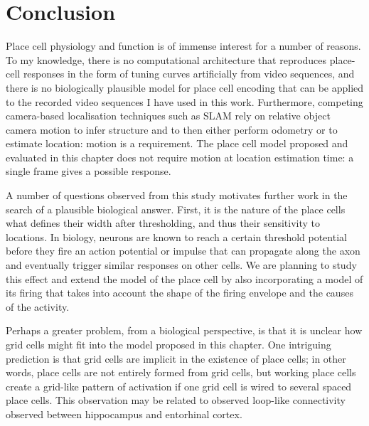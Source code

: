 %



\section{Conclusion}

Place cell physiology and function is of immense interest for a number of reasons. To my knowledge, there is no computational architecture that reproduces place-cell responses in the form of tuning curves artificially from video sequences, and there is no biologically plausible model for place cell encoding that can be applied to the recorded video sequences I have used in this work.  Furthermore, competing camera-based localisation techniques such as SLAM rely on relative object camera motion to infer structure and to then either perform odometry or to estimate location: motion is a requirement.  The place cell model proposed and evaluated in this chapter does not require motion at location estimation time: a single frame gives a possible response.

A number of questions observed from this study motivates further work in the search of a plausible biological answer. First, it is the nature of the place cells what defines their width after thresholding, and thus their sensitivity to locations. In biology, neurons are known to reach a certain threshold potential before they fire an action potential or impulse that can propagate along the axon and eventually trigger similar responses on other cells. We are planning to study this effect and extend the model of the place cell by also incorporating a model of its firing that takes into account the shape of the firing envelope and the causes of the activity.

Perhaps a greater problem, from a biological perspective, is that it is unclear how grid cells might fit into the model proposed in this chapter.  One intriguing prediction is that grid cells are implicit in the existence of place cells; in other words, place cells are not entirely formed from grid cells, but working place cells create a grid-like pattern of activation if one grid cell is wired to several spaced place cells.  This observation may be related to observed loop-like connectivity observed between hippocampus and entorhinal cortex. 

